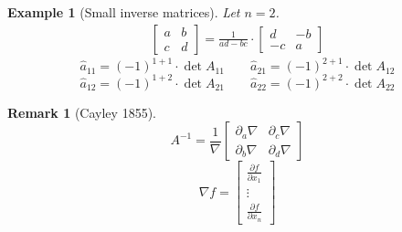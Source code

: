 \documentclass{article}
\newtheorem{example}{Example}  \numberwithin{example}{section}
\newtheorem{remark}{Remark}  \numberwithin{remark}{section}
\begin{document}
\begin{example}[Small inverse matrices] %
  Let $n=2$.
  \begin{align*}
    \begin{bmatrix}
     a & b \\
     c & d
    \end{bmatrix}
    = \frac{1}{ad - bc} \cdot
    \begin{bmatrix} d & -b \\ -c & a \end{bmatrix}
  \end{align*}
  \[ \hat{a}_{11} = (-1)^{1+1} \cdot \det{A_{11}} \qquad \hat{a}_{21} = (-1)^{2+1} \cdot \det{A_{12}} \]
  \[ \hat{a}_{12} = (-1)^{1+2} \cdot \det{A_{21}} \qquad \hat{a}_{22} = (-1)^{2+2} \cdot \det{A_{22}} \]
\end{example}

\begin{remark}[Cayley 1855]
  \[ A^{-1} = \frac{1}{\nabla} \begin{bmatrix} \partial_a \nabla & \partial_c \nabla \\ \partial_b \nabla & \partial_d \nabla \end{bmatrix} \]
  \[ \nabla f = \begin{bmatrix} \frac{\partial f}{\partial x_1} \\ \vdots \\ \frac{\partial f}{\partial x_n} \end{bmatrix} \]
\end{remark}
\end{document}
